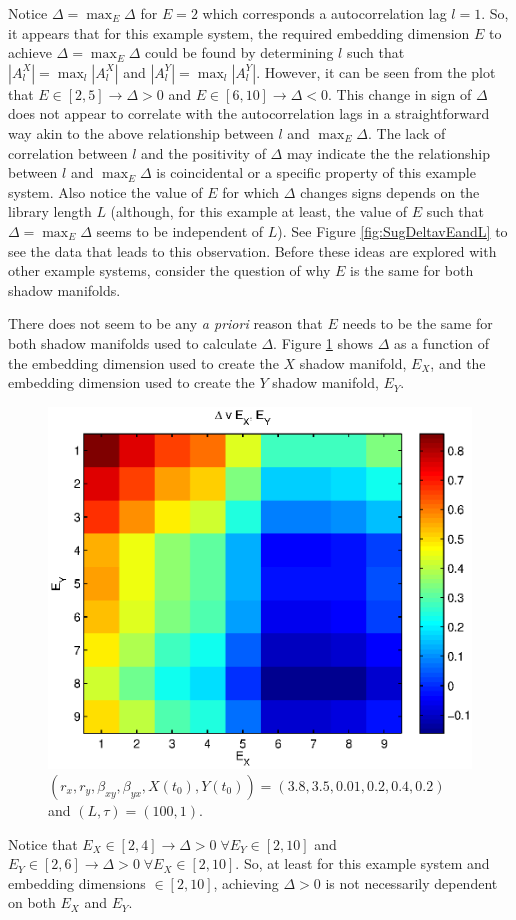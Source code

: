 \documentclass[a4paper,11pt]{article}
\begin{document}
Notice $\Delta = \max_E \Delta$ for $E=2$ which corresponds a autocorrelation lag $l=1$.  So, it appears that for this example system, the required embedding dimension $E$ to achieve $\Delta=\max_E \Delta$ could be found by determining $l$ such that $|A_l^X|=\max_l |A_l^X|$ and $|A_l^Y|=\max_l |A_l^Y|$.  However, it can be seen from the plot that $E\in [2,5]\rightarrow \Delta>0$ and $E\in [6,10]\rightarrow \Delta<0$.  This change in sign of $\Delta$ does not appear to correlate with the autocorrelation lags in a straightforward way akin to the above relationship between $l$ and $\max_E \Delta$.  The lack of correlation between $l$ and the positivity of $\Delta$ may indicate the the relationship between $l$ and $\max_E \Delta$ is coincidental or a specific property of this example system.  Also notice the value of $E$ for which $\Delta$ changes signs depends on the library length $L$ (although, for this example at least, the value of $E$ such that $\Delta = \max_E \Delta$ seems to be independent of $L$).  See Figure \ref{fig:SugDeltavEandL} to see the data that leads to this observation.  Before these ideas are explored with other example systems, consider the question of why $E$ is the same for both shadow manifolds.

There does not seem to be any {\em a priori} reason that $E$ needs to be the same for both shadow manifolds used to calculate $\Delta$.  Figure \ref{fig:SugExVaryE} shows $\Delta$ as a function of the embedding dimension used to create the $X$ shadow manifold, $E_X$, and the embedding dimension used to create the $Y$ shadow manifold, $E_Y$.  
\begin{figure}[h!t]
\centering
\label{fig:SugExVaryE}
\includegraphics[scale=0.55]{graphics/SugExVaryE.eps}
\caption{$\left(r_x,r_y,\beta_{xy},\beta_{yx},X(t_0),Y(t_0)\right) = \left(3.8,3.5,0.01,0.2,0.4,0.2\right)$ and $\left(L,\tau\right) = \left(100,1\right)$.}
\end{figure}
Notice that $E_X \in [2,4]\rightarrow \Delta>0\;\forall E_Y\in[2,10]$ and $E_Y \in[2,6]\rightarrow \Delta>0\;\forall E_X\in[2,10]$.  So, at least for this example system and embedding dimensions $\in[2,10]$, achieving $\Delta>0$ is not necessarily dependent on both $E_X$ and $E_Y$.  
\end{document}
